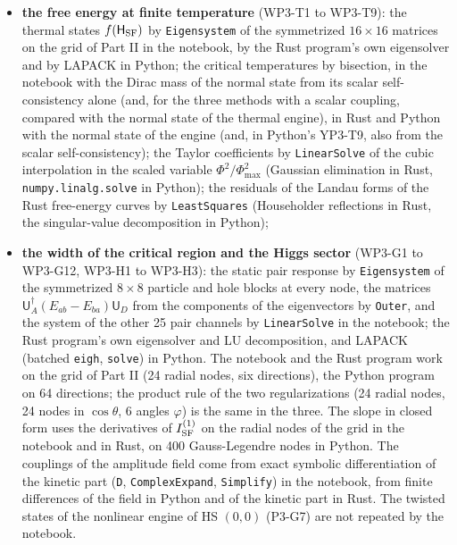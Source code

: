 \documentclass[
  10pt,
]{article}
\begin{document}
\begin{itemize}
  and the Richardson extrapolation in the two programs; the integral
  with the term \(\tfrac1{16}s^2\ln s\) exactly, by \texttt{Integrate},
  \texttt{FullSimplify} and \texttt{Series}, in the notebook alone (it
  is shown, not checked);
\item
  \textbf{the free energy at finite temperature} (WP3-T1 to WP3-T9): the
  thermal states \(f(\mathsf H_{\rm SF})\) by \texttt{Eigensystem} of
  the symmetrized \(16\times16\) matrices on the grid of Part II in the
  notebook, by the Rust program's own eigensolver and by LAPACK in
  Python; the critical temperatures by bisection, in the notebook with
  the Dirac mass of the normal state from its scalar self-consistency
  alone (and, for the three methods with a scalar coupling, compared
  with the normal state of the thermal engine), in Rust and Python with
  the normal state of the engine (and, in Python's YP3-T9, also from the
  scalar self-consistency); the Taylor coefficients by
  \texttt{LinearSolve} of the cubic interpolation in the scaled variable
  \(\Phi^2/\Phi^2_{\max}\) (Gaussian elimination in Rust,
  \texttt{numpy.linalg.solve} in Python); the residuals of the Landau
  forms of the Rust free-energy curves by \texttt{LeastSquares}
  (Householder reflections in Rust, the singular-value decomposition in
  Python);
\item
  \textbf{the width of the critical region and the Higgs sector} (WP3-G1
  to WP3-G12, WP3-H1 to WP3-H3): the static pair response by
  \texttt{Eigensystem} of the symmetrized \(8\times8\) particle and hole
  blocks at every node, the matrices
  \(\mathsf U_A^\dagger(E_{ab}-E_{ba})\mathsf U_D\) from the components
  of the eigenvectors by \texttt{Outer}, and the system of the other 25
  pair channels by \texttt{LinearSolve} in the notebook; the Rust
  program's own eigensolver and LU decomposition, and LAPACK (batched
  \texttt{eigh}, \texttt{solve}) in Python. The notebook and the Rust
  program work on the grid of Part II (24 radial nodes, six directions),
  the Python program on 64 directions; the product rule of the two
  regularizations (24 radial nodes, 24 nodes in \(\cos\theta\), 6 angles
  \(\varphi\)) is the same in the three. The slope in closed form uses
  the derivatives of \(I^{(1)}_{\rm SF}\) on the radial nodes of the
  grid in the notebook and in Rust, on 400 Gauss-Legendre nodes in
  Python. The couplings of the amplitude field come from exact symbolic
  differentiation of the kinetic part (\texttt{D},
  \texttt{ComplexExpand}, \texttt{Simplify}) in the notebook, from
  finite differences of the field in Python and of the kinetic part in
  Rust. The twisted states of the nonlinear engine of HS \((0,0)\)
  (P3-G7) are not repeated by the notebook.
\end{itemize}
\end{document}
